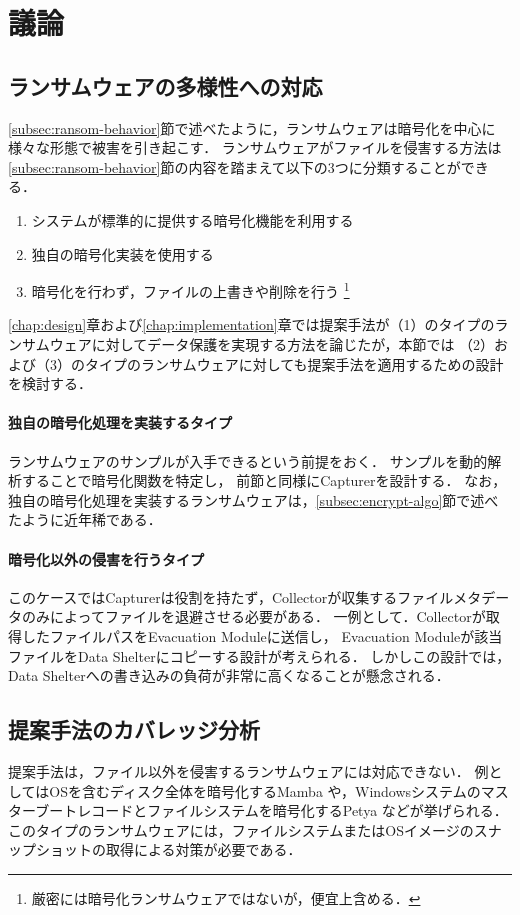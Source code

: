 \chapter{議論}
\section{ランサムウェアの多様性への対応}
\ref{subsec:ransom-behavior}節で述べたように，ランサムウェアは暗号化を中心に様々な形態で被害を引き起こす．
ランサムウェアがファイルを侵害する方法は\ref{subsec:ransom-behavior}節の内容を踏まえて以下の3つに分類することができる．
\begin{enumerate}
  \item システムが標準的に提供する暗号化機能を利用する
  \item 独自の暗号化実装を使用する
  \item 暗号化を行わず，ファイルの上書きや削除を行う \footnote{厳密には暗号化ランサムウェアではないが，便宜上含める．}
\end{enumerate}
\ref{chap:design}章および\ref{chap:implementation}章では提案手法が（1）のタイプのランサムウェアに対してデータ保護を実現する方法を論じたが，本節では
（2）および（3）のタイプのランサムウェアに対しても提案手法を適用するための設計を検討する．

\subsubsection{独自の暗号化処理を実装するタイプ}
ランサムウェアのサンプルが入手できるという前提をおく．
サンプルを動的解析することで暗号化関数を特定し，
前節と同様にCapturerを設計する．
なお，独自の暗号化処理を実装するランサムウェアは，\ref{subsec:encrypt-algo}節で述べたように近年稀である．


\subsubsection{暗号化以外の侵害を行うタイプ}
このケースではCapturerは役割を持たず，Collectorが収集するファイルメタデータのみによってファイルを退避させる必要がある．
一例として．Collectorが取得したファイルパスをEvacuation Moduleに送信し，
Evacuation Moduleが該当ファイルをData Shelterにコピーする設計が考えられる．
しかしこの設計では，Data Shelterへの書き込みの負荷が非常に高くなることが懸念される．


\section{提案手法のカバレッジ分析}
提案手法は，ファイル以外を侵害するランサムウェアには対応できない．
例としてはOSを含むディスク全体を暗号化するMamba \cite{mamba-petya} や，Windowsシステムのマスターブートレコードとファイルシステムを暗号化するPetya \cite{mamba-petya} などが挙げられる．
このタイプのランサムウェアには，ファイルシステムまたはOSイメージのスナップショットの取得による対策が必要である．

